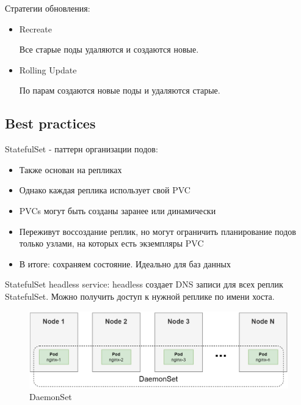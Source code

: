 Стратегии обновления:
\begin{itemize}
    \item Recreate
    
    Все старые поды удаляются и создаются новые.
    \item Rolling Update
    
    По парам создаются новые поды и удаляются старые.
\end{itemize}

\subsection*{Best practices}

StatefulSet - паттерн организации подов:
\begin{itemize}
    \item Также основан на репликах
    \item Однако каждая реплика использует свой PVC
    \item PVCs могут быть созданы заранее или динамически
    \item Переживут воссоздание реплик, но могут ограничить планирование подов только узлами, на которых есть экземпляры PVC
    \item В итоге: сохраняем состояние. Идеально для баз данных
\end{itemize}

StatefulSet headless service: headless создает DNS записи для всех реплик
StatefulSet. Можно получить доступ к нужной реплике по имени хоста.


\begin{figure}[H]
	\centering
	\begin{minipage}[b]{0.6\textwidth}
		\includegraphics[width=\textwidth]{images/kds.png}
        \caption{DaemonSet}
	\end{minipage}
\end{figure}


